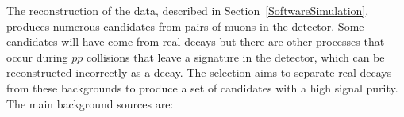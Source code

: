 The reconstruction of the data, described in Section~\ref{SoftwareSimulation}, produces numerous \bmumu candidates from pairs of muons in the detector. Some candidates will have come from real \bmumu decays but there are other processes that occur during $pp$ collisions that leave a signature in the detector, which can be reconstructed incorrectly as a \bmumu decay. %
The selection aims to separate real \bmumu decays from these backgrounds to produce a set of \bmumu candidates with a high signal purity. %
The main background sources are:
